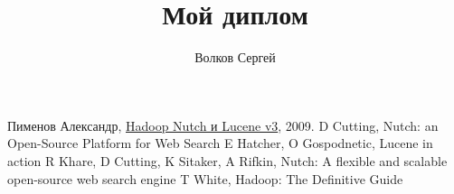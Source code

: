 \documentclass[a4paper,10pt]{report}
\title{Мой диплом}
\author{Волков Сергей}
\begin{document}
\maketitle

\begin{abstract}
\end{abstract}


%
%
%

\begin{thebibliography}{9}
 Пименов Александр, \href{http://mmcg.z52.ru/drupal/node/3}{Hadoop Nutch и Lucene v3}, 2009.
 D Cutting, Nutch: an Open-Source Platform for Web Search
 E Hatcher, O Gospodnetic, Lucene in action
 R Khare, D Cutting, K Sitaker, A Rifkin, Nutch: A flexible and scalable open-source web search engine
 T White, Hadoop: The Definitive Guide

\end{thebibliography}
\end{document}
